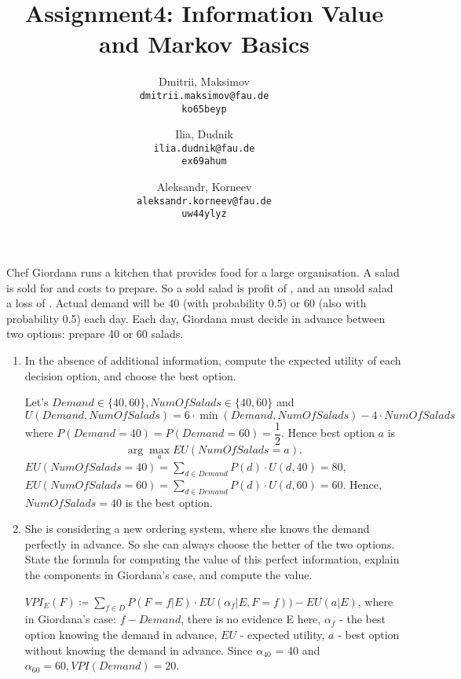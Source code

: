 \documentclass{homework}
\title{Assignment4: Information Value and Markov Basics}
\author{
  Dmitrii, Maksimov\\
  \texttt{dmitrii.maksimov@fau.de} \\
  \texttt{ko65beyp}
  \and
  Ilia, Dudnik\\
  \texttt{ilia.dudnik@fau.de}\\
  \texttt{ex69ahum}
  \and
  Aleksandr, Korneev\\
  \texttt{aleksandr.korneev@fau.de}\\
  \texttt{uw44ylyz}
}
\begin{document}
\maketitle

Chef Giordana runs a kitchen that provides food for a large organisation. A salad is sold for  and costs  to prepare. So a sold salad is profit of , and an unsold salad a loss of . Actual demand will be 40 (with probability 0.5) or 60 (also with probability 0.5) each day.
Each day, Giordana must decide in advance between two options: prepare 40 or 60 salads.
\begin{enumerate}
	\item In the absence of additional information, compute the expected utility of each decision option, and choose the best option.
	
	Let's $Demand \in \{40, 60\},NumOfSalads \in \{40, 60\}$ and \newline$U(Demand,  NumOfSalads) = 6\cdot \min(Demand, NumOfSalads) - 4\cdot NumOfSalads$  \newline where $P(Demand = 40) = P(Demand = 60) = \dfrac{1}{2}$. Hence best option $a$ is \[\arg \max_{a} EU(NumOfSalads = a).\]
$EU(NumOfSalads = 40) = \sum_{d\in Demand} P(d)\cdot U(d, 40) = 80$,\newline $EU(NumOfSalads = 60) = \sum_{d\in Demand} P(d)\cdot U(d, 60) = 60$. \newline Hence, $NumOfSalads = 40$ is the best option.
	\item She is considering a new ordering system, where she knows the demand perfectly in advance. So she can always choose the better of the two options. State the formula for computing the value of this perfect information, explain the components in Giordana's case, and compute the value.

	$VPI_E(F)\coloneqq \sum_{f\in D} P(F=f|E)\cdot EU(\alpha_f|E, F=f))-EU(a|E)$, \newline where in Giordana's case: $f - Demand$, there is no evidence E here, $\alpha_f$ - the best option knowing the demand in advance, $EU$ - expected utility, $a$ - best option without knowing the demand in advance. \newline Since $\alpha_{40}$ = 40 and $\alpha_{60} = 60, VPI(Demand) = 20$.
\end{enumerate}
\end{document}

